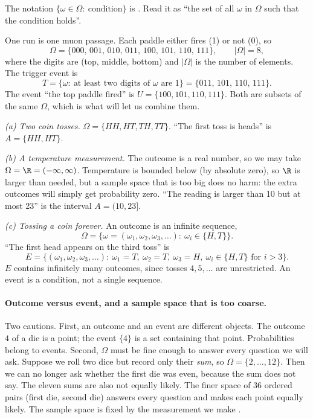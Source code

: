 The notation $\{\omega\in\Omega:\ \text{condition}\}$ is . Read it as ``the set of all $\omega$ in $\Omega$ such that the
condition holds''.

\label{1a:ex:telescope}
One run is one muon passage. Each paddle either fires (1) or not (0), so
\[
\Omega=\{000,\,001,\,010,\,011,\,100,\,101,\,110,\,111\},\qquad |\Omega|=8,
\]
where the digits are (top, middle, bottom) and $|\Omega|$ is the number of
elements. The trigger event is
\[
T=\{\omega:\ \text{at least two digits of }\omega\text{ are }1\}
 =\{011,\,101,\,110,\,111\}.
\]
The event ``the top paddle fired'' is $U=\{100,101,110,111\}$. Both are
subsets of the same $\Omega$, which is what will let us combine them.

\label{1a:ex:aos-spaces}
\emph{(a) Two coin tosses.} $\Omega=\{HH,HT,TH,TT\}$. ``The first toss is
heads'' is $A=\{HH,HT\}$.

\emph{(b) A temperature measurement.} The outcome is a real number, so we may
take $\Omega=\R=(-\infty,\infty)$. Temperature is bounded below (by absolute
zero), so $\R$ is larger than needed, but a sample space that is too big does
no harm: the extra outcomes will simply get probability zero. ``The reading is
larger than 10 but at most 23'' is the interval $A=(10,23]$.

\emph{(c) Tossing a coin forever.} An outcome is an infinite sequence,
\[
\Omega=\bigl\{\omega=(\omega_1,\omega_2,\omega_3,\dots):\ \omega_i\in\{H,T\}\bigr\}.
\]
``The first head appears on the third toss'' is
\[
E=\bigl\{(\omega_1,\omega_2,\omega_3,\dots):\ \omega_1=T,\ \omega_2=T,\ \omega_3=H,\
\omega_i\in\{H,T\}\text{ for } i>3\bigr\}.
\]
$E$ contains infinitely many outcomes, since tosses $4,5,\dots$ are
unrestricted. An event is a condition, not a single sequence.

\paragraph{Outcome versus event, and a sample space that is too coarse.}
Two cautions. First, an outcome and an event are different objects. The outcome
$4$ of a die is a point; the event $\{4\}$ is a set containing that point.
Probabilities belong to events. Second, $\Omega$ must be fine enough to answer
every question we will ask. Suppose we roll two dice but record only their
\emph{sum}, so $\Omega=\{2,\dots,12\}$. Then we can no longer ask whether the
first die was even, because the sum does not say. The eleven sums are also not
equally likely. The finer space of 36 ordered pairs (first die, second die)
answers every question and makes each point equally likely. The sample space is
fixed by the measurement we make \srcref{Kruschke}{\S4.1}.

